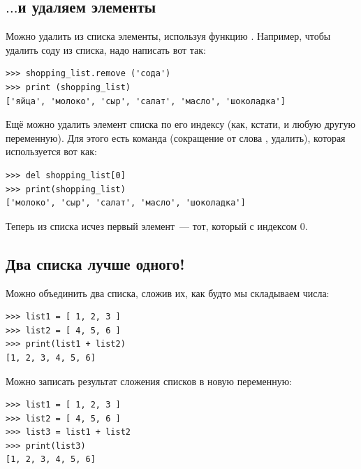 
\subsection*{\color{BrickRed}$\ldots$и удаляем элементы}

Можно удалить из списка элементы, используя функцию . Например, чтобы удалить соду из списка, надо написать вот так:

\begin{listing}
\begin{verbatim}
>>> shopping_list.remove ('сода')
>>> print (shopping_list)
['яйца', 'молоко', 'сыр', 'салат', 'масло', 'шоколадка']
\end{verbatim}
\end{listing}

Ещё можно удалить элемент списка по его индексу (как, кстати, и любую другую переменную). Для этого есть команда  (сокращение от слова , удалить), которая используется вот как:

\begin{listing}
\begin{verbatim}
>>> del shopping_list[0]
>>> print(shopping_list)
['молоко', 'сыр', 'салат', 'масло', 'шоколадка']
\end{verbatim}
\end{listing}

Теперь из списка исчез первый элемент — тот, который с индексом 0.

\subsection*{\color{BrickRed}Два списка лучше одного!}

Можно объединить два списка, сложив их, как будто мы складываем числа:

\begin{listing}
\begin{verbatim}
>>> list1 = [ 1, 2, 3 ]
>>> list2 = [ 4, 5, 6 ]
>>> print(list1 + list2)
[1, 2, 3, 4, 5, 6]
\end{verbatim}
\end{listing}

Можно записать результат сложения списков в новую переменную:

\begin{listing}
\begin{verbatim}
>>> list1 = [ 1, 2, 3 ]
>>> list2 = [ 4, 5, 6 ]
>>> list3 = list1 + list2
>>> print(list3)
[1, 2, 3, 4, 5, 6]
\end{verbatim}
\end{listing}

